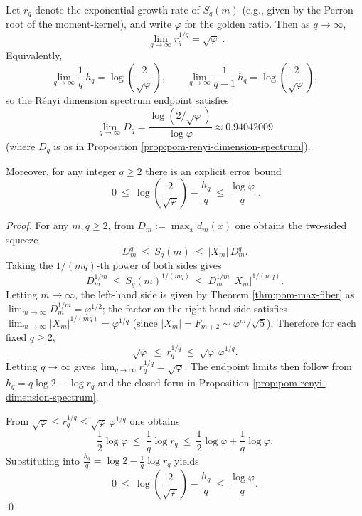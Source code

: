 \begin{proposition}\label{prop:pom-rq-qinfty-endpoint}
Let \(r_q\) denote the exponential growth rate of \(S_q(m)\) (e.g., given by the Perron root of the moment-kernel), and write \(\varphi\) for the golden ratio.
Then as \(q\to\infty\),
\[
\boxed{\;
\lim_{q\to\infty} r_q^{1/q}=\sqrt{\varphi}\; }.
\]
Equivalently,
\[
\lim_{q\to\infty}\frac{1}{q}\,h_q
=\log\!\left(\frac{2}{\sqrt{\varphi}}\right),
\qquad
\lim_{q\to\infty}\frac{1}{q-1}\,h_q
=\log\!\left(\frac{2}{\sqrt{\varphi}}\right),
\]
so the R\'enyi dimension spectrum endpoint satisfies
\[
\lim_{q\to\infty}D_q
=\frac{\log\!\left(2/\sqrt{\varphi}\right)}{\log\varphi}
\approx 0.94042009
\]
(where \(D_q\) is as in Proposition \ref{prop:pom-renyi-dimension-spectrum}).
\par
Moreover, for any integer \(q\ge 2\) there is an explicit error bound
\[
\boxed{\;
0\ \le\ \log\!\left(\frac{2}{\sqrt{\varphi}}\right)-\frac{h_q}{q}\ \le\ \frac{\log\varphi}{q}\; }.
\]
\end{proposition}
\begin{proof}
For any \(m,q\ge 2\), from
\(
D_m:=\max_x d_m(x)
\)
one obtains the two-sided squeeze
\[
D_m^q\ \le\ S_q(m)\ \le\ |X_m|\,D_m^q.
\]
Taking the \(1/(mq)\)-th power of both sides gives
\[
D_m^{1/m}\ \le\ S_q(m)^{1/(mq)}\ \le\ D_m^{1/m}\,|X_m|^{1/(mq)}.
\]
Letting \(m\to\infty\), the left-hand side is given by Theorem \ref{thm:pom-max-fiber} as
\(
\lim_{m\to\infty}D_m^{1/m}=\varphi^{1/2}
\);
the factor on the right-hand side satisfies
\(
\lim_{m\to\infty}|X_m|^{1/(mq)}=\varphi^{1/q}
\)
(since \(|X_m|=F_{m+2}\sim \varphi^m/\sqrt5\)).
Therefore for each fixed \(q\ge 2\),
\[
\sqrt{\varphi}\ \le\ r_q^{1/q}\ \le\ \sqrt{\varphi}\,\varphi^{1/q}.
\]
Letting \(q\to\infty\) gives \(\lim_{q\to\infty}r_q^{1/q}=\sqrt{\varphi}\).
The endpoint limits then follow from \(h_q=q\log 2-\log r_q\) and the closed form in Proposition \ref{prop:pom-renyi-dimension-spectrum}.
\par
From \(\sqrt{\varphi}\le r_q^{1/q}\le \sqrt{\varphi}\,\varphi^{1/q}\) one obtains
\[
\frac{1}{2}\log\varphi\ \le\ \frac{1}{q}\log r_q\ \le\ \frac{1}{2}\log\varphi+\frac{1}{q}\log\varphi.
\]
Substituting into \(\frac{h_q}{q}=\log 2-\frac{1}{q}\log r_q\) yields
\[
0\ \le\ \log\!\left(\frac{2}{\sqrt{\varphi}}\right)-\frac{h_q}{q}\ \le\ \frac{\log\varphi}{q}.
\]
\qed
\end{proof}

